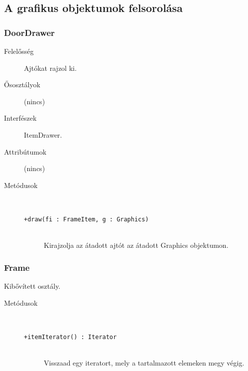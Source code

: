 	\subsection{A grafikus objektumok felsorolása}
	
		\subsubsection{DoorDrawer}
			\begin{description}

				\item[Felelősség] Ajtókat rajzol ki.

				\item[Ősosztályok] (nincs)
				\item[Interfészek] ItemDrawer.
				\item[Attribútumok] (nincs)
				\item[Metódusok]$\ $
					\begin{description}
						\item[\texttt{+draw(fi : FrameItem, g : Graphics)}] \hfill \\Kirajzolja az átadott ajtót az átadott Graphics objektumon. 
					\end{description}
			\end{description}

		\subsubsection{Frame}
			Kibővített osztály.
			\begin{description}
				\item[Metódusok]$\ $
					\begin{description}
						\item[\texttt{+itemIterator() : Iterator}] \hfill \\Visszaad egy iteratort, mely a tartalmazott  elemeken megy végig. 
					\end{description}
			\end{description}
			

